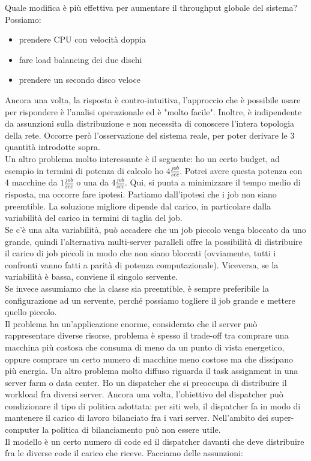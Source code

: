 \documentclass{article}
\begin{document}
Quale modifica è più effettiva per aumentare il throughput globale del sistema? Possiamo:
\begin{itemize}
\item prendere CPU con velocità doppia
\item fare load balancing dei due dischi
\item prendere un secondo disco veloce
\end{itemize}
Ancora una volta, la risposta è contro-intuitiva, l'approccio che è possibile usare per rispondere è l'analisi operazionale ed è "molto facile". Inoltre, è indipendente da assunzioni sulla distribuzione e non necessita di conoscere l'intera topologia della rete. Occorre però l'osservazione del sistema reale, per poter derivare le 3 quantità introdotte sopra.\\ Un altro problema molto interessante è il seguente: ho un certo budget, ad esempio in termini di potenza di calcolo ho $4\frac{job}{sec}$. Potrei avere questa potenza con 4 macchine da $1\frac{job}{sec}$ o una da $4\frac{job}{sec}$. Qui, si punta a minimizzare il tempo medio di risposta, ma occorre fare ipotesi. Partiamo dall'ipotesi che i job non siano preemtible. La soluzione migliore dipende dal carico, in particolare dalla variabilità del carico in termini di taglia del job.\\ Se c'è una alta variabilità, può accadere che un job piccolo venga bloccato da uno grande, quindi l'alternativa multi-server paralleli offre la possibilità di distribuire il carico di job piccoli in modo che non siano bloccati (ovviamente, tutti i confronti vanno fatti a parità di potenza computazionale). Viceversa, se la variabilità è bassa, conviene il singolo servente.\\ Se invece assumiamo che la classe sia preemtible, è sempre preferibile la configurazione ad un servente, perché possiamo togliere il job grande e mettere quello piccolo.\\ Il problema ha un'applicazione enorme, considerato che il server può rappresentare diverse risorse, problema è spesso il trade-off tra comprare una macchina più costosa che consuma di meno da un punto di vista energetico, oppure comprare un certo numero di macchine meno costose ma che dissipano più energia.
Un  altro problema molto diffuso riguarda il task assignment in una server farm o data center. Ho un dispatcher che si preoccupa di distribuire il workload fra diversi server. Ancora una volta, l'obiettivo del dispatcher può condizionare il tipo di politica adottata: per siti web, il dispatcher fa in modo di mantenere il carico di lavoro bilanciato fra i vari server. Nell'ambito dei super-computer la politica di bilanciamento può non essere utile.\\ Il modello è un certo numero di code ed il dispatcher davanti che deve distribuire fra le diverse code il carico che riceve. Facciamo delle assunzioni:
\end{document}
